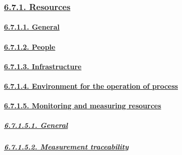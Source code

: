 \documentclass[
]{article}
\begin{document}
\hypertarget{resources}{%
\subsubsection{\texorpdfstring{\protect\hyperlink{resources-1}{6.7.1.
Resources}}{6.7.1. Resources}}\label{resources}}

\hypertarget{general-1}{%
\paragraph{\texorpdfstring{\protect\hyperlink{general-10}{6.7.1.1.
General}}{6.7.1.1. General}}\label{general-1}}

\hypertarget{people}{%
\paragraph{\texorpdfstring{\protect\hyperlink{people-1}{6.7.1.2.
People}}{6.7.1.2. People}}\label{people}}

\hypertarget{infrastructure}{%
\paragraph{\texorpdfstring{\protect\hyperlink{infrastructure-1}{6.7.1.3.
Infrastructure}}{6.7.1.3. Infrastructure}}\label{infrastructure}}

\hypertarget{environment-for-the-operation-of-process}{%
\paragraph{\texorpdfstring{\protect\hyperlink{environment-for-the-operation-of-process-1}{6.7.1.4.
Environment for the operation of
process}}{6.7.1.4. Environment for the operation of process}}\label{environment-for-the-operation-of-process}}

\hypertarget{monitoring-and-measuring-resources}{%
\paragraph{\texorpdfstring{\protect\hyperlink{monitoring-and-measuring-resources-1}{6.7.1.5.
Monitoring and measuring
resources}}{6.7.1.5. Monitoring and measuring resources}}\label{monitoring-and-measuring-resources}}

\hypertarget{general-2}{%
\subparagraph{\texorpdfstring{\protect\hyperlink{general-11}{6.7.1.5.1.
General}}{6.7.1.5.1. General}}\label{general-2}}

\hypertarget{measurement-traceability}{%
\subparagraph{\texorpdfstring{\protect\hyperlink{measurement-traceability-1}{6.7.1.5.2.
Measurement
traceability}}{6.7.1.5.2. Measurement traceability}}\label{measurement-traceability}}
\end{document}
